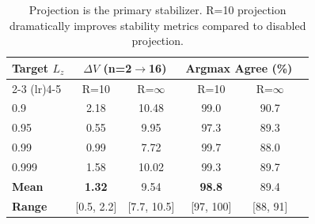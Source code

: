 \begin{table}[t]
\centering
\caption{Projection is the primary stabilizer. R=10 projection dramatically improves stability metrics compared to disabled projection.}
\label{tab:exp2_projection_stabilizer}
\begin{tabular}{lccccc}
\toprule
Target $L_z$ & \multicolumn{2}{c}{$\Delta V$ (n=2$\to$16)} & \multicolumn{2}{c}{Argmax Agree (\%)} \\
\cmidrule(lr){2-3} \cmidrule(lr){4-5}
 & R=10 & R=$\infty$ & R=10 & R=$\infty$ \\
\midrule
  0.9 & 2.18 & 10.48 & 99.0 & 90.7 \\
  0.95 & 0.55 & 9.95 & 97.3 & 89.3 \\
  0.99 & 0.99 & 7.72 & 99.7 & 88.0 \\
  0.999 & 1.58 & 10.02 & 99.3 & 89.7 \\
\midrule
  \textbf{Mean} & \textbf{1.32} & 9.54 & \textbf{98.8} & 89.4 \\
  \textbf{Range} & [0.5, 2.2] & [7.7, 10.5] & [97, 100] & [88, 91] \\
\bottomrule
\end{tabular}
\end{table}